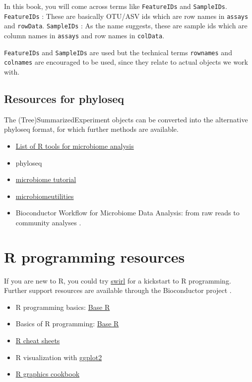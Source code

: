 \documentclass[
]{book}
\providecommand{\tightlist}{%
  \setlength{\itemsep}{0pt}\setlength{\parskip}{0pt}}
\begin{document}
In this book, you will come across terms like \texttt{FeatureIDs} and
\texttt{SampleIDs}. \texttt{FeatureIDs} : These are basically OTU/ASV ids which are
row names in \texttt{assays} and \texttt{rowData}. \texttt{SampleIDs} : As the name
suggests, these are sample ids which are column names in \texttt{assays} and
row names in \texttt{colData}.

\texttt{FeatureIDs} and \texttt{SampleIDs} are used but the technical terms
\texttt{rownames} and \texttt{colnames} are encouraged to be used, since they relate
to actual objects we work with.

\hypertarget{resources-for-phyloseq}{%
\subsection{Resources for phyloseq}\label{resources-for-phyloseq}}

The (Tree)SummarizedExperiment objects can be converted into the alternative phyloseq format, for which further methods are available.

\begin{itemize}
\tightlist
\item
  \href{https://microsud.github.io/Tools-Microbiome-Analysis/}{List of R tools for microbiome analysis}
\item
  phyloseq \citep{McMurdie2013}
\item
  \href{http://microbiome.github.io/tutorials/}{microbiome tutorial}
\item
  \href{https://microsud.github.io/microbiomeutilities/}{microbiomeutilities}
\item
  Bioconductor Workflow for Microbiome Data Analysis: from raw reads to community analyses \citep{Callahan2016}.
\end{itemize}

\hypertarget{r-programming-resources}{%
\section{R programming resources}\label{r-programming-resources}}

If you are new to R, you could try \href{https://swirlstats.com/}{swirl}
for a kickstart to R programming. Further support resources are
available through the Bioconductor
project \citep{Huber2015}.

\begin{itemize}
\tightlist
\item
  R programming basics: \href{https://www.rstudio.com/wp-content/uploads/2016/10/r-cheat-sheet-3.pdf}{Base R}
\item
  Basics of R programming: \href{https://raw.githubusercontent.com/rstudio/cheatsheets/master/base-r.pdf}{Base R}
\item
  \href{https://www.rstudio.com/resources/cheatsheets/}{R cheat sheets}
\item
  R visualization with \href{https://www.rstudio.com/wp-content/uploads/2016/11/ggplot2-cheatsheet-2.1.pdf}{ggplot2}
\item
  \href{http://www.cookbook-r.com/Graphs/}{R graphics cookbook}
\end{itemize}
\end{document}
